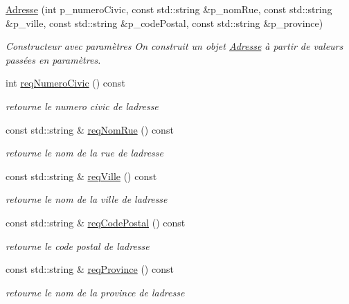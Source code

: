 \begin{DoxyCompactItemize}
\item 
\hyperlink{classutil_1_1Adresse_a2c646a0226925bb32c4db8463ed887d5}{Adresse} (int p\+\_\+numero\+Civic, const std\+::string \&p\+\_\+nom\+Rue, const std\+::string \&p\+\_\+ville, const std\+::string \&p\+\_\+code\+Postal, const std\+::string \&p\+\_\+province)
\begin{DoxyCompactList}\small\item\em Constructeur avec paramètres On construit un objet \hyperlink{classutil_1_1Adresse}{Adresse} à partir de valeurs passées en paramètres. \end{DoxyCompactList}\item 
int \hyperlink{classutil_1_1Adresse_a5b5472020a325014c0296819beba184b}{req\+Numero\+Civic} () const
\begin{DoxyCompactList}\small\item\em retourne le numero civic de l\textquotesingle{}adresse \end{DoxyCompactList}\item 
const std\+::string \& \hyperlink{classutil_1_1Adresse_aa6446c6a166a7ef16700ce5098df4337}{req\+Nom\+Rue} () const
\begin{DoxyCompactList}\small\item\em retourne le nom de la rue de l\textquotesingle{}adresse \end{DoxyCompactList}\item 
const std\+::string \& \hyperlink{classutil_1_1Adresse_a084353601fe763f34dba9ca03af5abe2}{req\+Ville} () const
\begin{DoxyCompactList}\small\item\em retourne le nom de la ville de l\textquotesingle{}adresse \end{DoxyCompactList}\item 
const std\+::string \& \hyperlink{classutil_1_1Adresse_ad4d1a2d82f33ac08b8a647fd479f9edc}{req\+Code\+Postal} () const
\begin{DoxyCompactList}\small\item\em retourne le code postal de l\textquotesingle{}adresse \end{DoxyCompactList}\item 
const std\+::string \& \hyperlink{classutil_1_1Adresse_a9f6048ebc5b0e8bf9a329eb8d9ec2de4}{req\+Province} () const
\begin{DoxyCompactList}\small\item\em retourne le nom de la province de l\textquotesingle{}adresse \end{DoxyCompactList}\item 

\end{DoxyCompactItemize}
